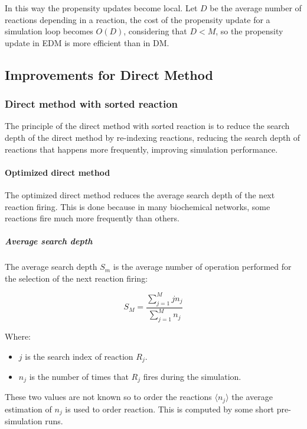     

    In this way the propensity updates become local.
    Let $D$ be the average number of reactions depending in a reaction, the cost of the propensity update for a simulation loop becomes $O(D)$, considering that $D<M$, so the propensity update in EDM is more efficient than in DM.

  \subsection{Improvements for Direct Method}

    \subsubsection{Direct method with sorted reaction}
    The principle of the direct method with sorted reaction is to reduce the search depth of the direct method by re-indexing reactions, reducing the search depth of reactions that happens more frequently, improving simulation performance.

      \paragraph{Optimized direct method}
      The optimized direct method reduces the average search depth of the next reaction firing.
      This is done because in many biochemical networks, some reactions fire much more frequently than others.

        \subparagraph{Average search depth}
        The average search depth $S_m$ is the average number of operation performed for the selection of the next reaction firing:

        $$S_M = \frac{\sum\limits_{j=1}^Mjn_j}{\sum\limits_{j=1}^Mn_j}$$

        Where:

        \begin{multicols}{2}
          \begin{itemize}
            \item $j$ is the search index of reaction $R_j$.
            \item $n_j$ is the number of times that $R_j$ fires during the simulation.
          \end{itemize}
        \end{multicols}

        These two values are not known so to order the reactions $\langle n_j\rangle$ the average estimation of $n_j$ is used to order reaction.
        This is computed by some short pre-simulation runs.

